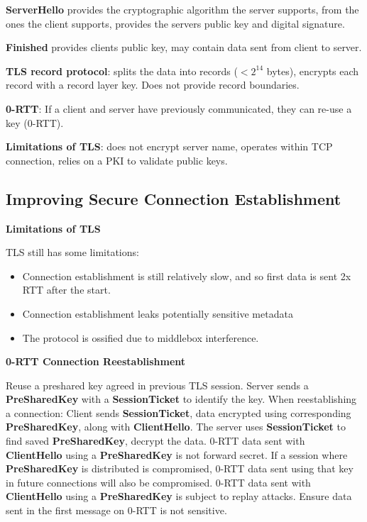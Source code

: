 \documentclass{article}
\begin{document}
\textbf{ServerHello} provides the cryptographic algorithm the server supports, from the ones the client supports, provides the servers public key and digital signature.

\textbf{Finished} provides clients public key, may contain data sent from client to server.

\textbf{TLS record protocol}: splits the data into records ($< 2^{14}$ bytes), encrypts each record with a record layer key. Does not provide record boundaries.

\textbf{0-RTT}: If a client and server have previously communicated, they can re-use a key (0-RTT).

\textbf{Limitations of TLS}: does not encrypt server name, operates within TCP connection, relies on a PKI to validate public keys.


\clearpage

\subsection*{Improving Secure Connection Establishment}

\textbf{Limitations of TLS}

TLS still has some limitations:
\begin{itemize}
    \item Connection establishment is still relatively slow, and so first data is sent 2x RTT after the start.
    \item Connection establishment leaks potentially sensitive metadata
    \item The protocol is ossified due to middlebox interference.
\end{itemize}

\textbf{0-RTT Connection Reestablishment}

Reuse a preshared key agreed in previous TLS session.
Server sends a \textbf{PreSharedKey} with a \textbf{SessionTicket} to identify the key.
When reestablishing a connection: Client sends \textbf{SessionTicket}, data encrypted using corresponding
\textbf{PreSharedKey}, along with \textbf{ClientHello}. The server uses \textbf{SessionTicket} to find saved \textbf{PreSharedKey},
decrypt the data.
0-RTT data sent with \textbf{ClientHello} using a \textbf{PreSharedKey} is not forward secret.
If a session where \textbf{PreSharedKey} is distributed is compromised,
0-RTT data sent using that key in future connections will also be compromised.
0-RTT data sent with \textbf{ClientHello} using a \textbf{PreSharedKey} is subject to replay attacks.
Ensure data sent in the first message on 0-RTT is not sensitive.
\end{document}
